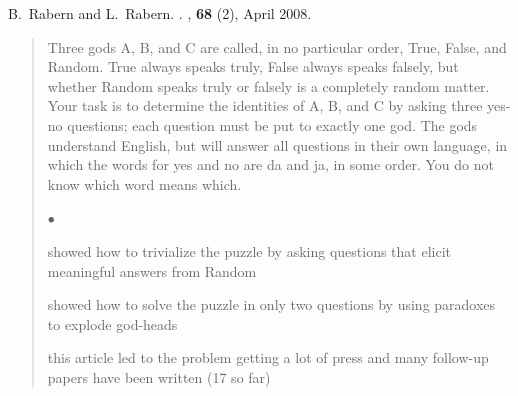 \documentclass[10pt]{article}
\newcommand{\squishlist}{
   \begin{list}{$\bullet$}
    { \setlength{\itemsep}{0pt}    \setlength{\parsep}{0pt}
      \setlength{\topsep}{4.5pt}     \setlength{\partopsep}{0pt}
      \setlength{\leftmargin}{2em} \setlength{\labelwidth}{1.5em}
      \setlength{\labelsep}{0.5em} } }
\newcommand{\squishend}{
    \end{list}  }
\begin{document}
\vspace{0.5in}
{\large
B.~Rabern and L.~Rabern.
\newblock \href{http://brianrabern.net/sshlpe.pdf}{\color{blue}{A simple solution to the hardest logic puzzle ever}}. 
, \textbf{68} (2), April 2008.}

\begin{quote}
Three gods A, B, and C are called, in no particular order, True, False, and Random. 
True always speaks truly, False always speaks falsely, but whether Random speaks truly or falsely is a completely random matter. 
Your task is to determine the identities of A, B, and C by asking three yes-no questions; each question must be put to exactly one god. 
The gods understand English, but will answer all questions in their own language, in which the words for yes and no are da and ja, in some order. 
You do not know which word means which.
	  \squishlist
		\item showed how to trivialize the puzzle by asking questions that elicit meaningful answers from Random
		\item showed how to solve the puzzle in only two questions by using paradoxes to explode god-heads
		\item this article led to the problem getting a lot of press and many follow-up papers have been written (17 so far)
      \squishend
\end{quote}
\end{document}
